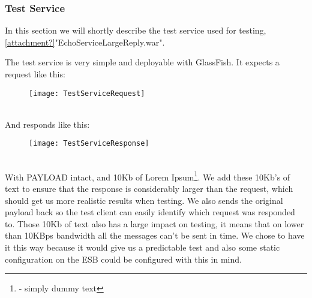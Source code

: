\subsubsection{Test Service}\label{Testing:About:Service}
    In this section we will shortly describe the test service used for testing, \ref{attachment?}"EchoServiceLargeReply.war".

    The test service is very simple and deployable with GlassFish. It expects a request like this:
    \begin{figure}[h]
        \centering
        \texttt{[image: TestServiceRequest]}
        \label{fig:TestServiceRequest}
    \end{figure}
    \\
    And responds like this:
    \begin{figure}[h]
        \centering
        \texttt{[image: TestServiceResponse]}
        \label{fig:TestServiceResponse}
    \end{figure}
    \\
    With PAYLOAD intact, and 10Kb of Lorem Ipsum\footnote{ - simply dummy text}. We add these 10Kb's of text to ensure that the response is considerably larger than the request, which should get us more realistic results when testing. We also sends the original payload back so the test client can easily identify which request was responded to. Those 10Kb of text also has a large impact on testing, it means that on lower than 10KBps bandwidth all the messages can't be sent in time. We chose to have it this way because it would give us a predictable test and also some static configuration on the ESB could be configured with this in mind.
